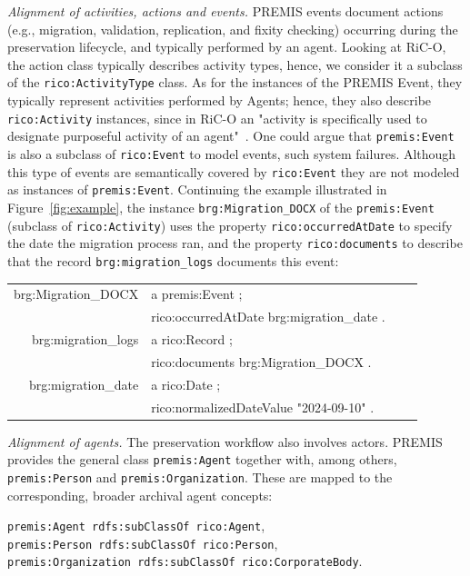 \documentclass[runningheads]{llncs}
\makeatletter
\newenvironment{rdfexpressions}
{%
	\par
	\begingroup
	\centering
	\ttfamily
	\begin{tabular}{@{}r@{\ }l@{\ }l@{}l@{}}
	}
	{%
	\end{tabular}
	\par
	\endgroup
}
\makeatother
\begin{document}
	
	\emph{Alignment of activities, actions and events.}
	PREMIS events document actions (e.g., migration, validation, replication, and fixity checking) occurring during the preservation lifecycle, and typically performed by an agent. Looking at RiC-O, the action class typically describes activity types, hence, we consider it a subclass of the \texttt{rico:ActivityType} class. As for the instances of the PREMIS Event, they typically represent activities performed by Agents; hence, they also describe \texttt{rico:Activity} instances, since in RiC-O an "activity is specifically used to designate purposeful activity of an agent"~\cite{RICCM,RiCO}. One could argue that \texttt{premis:Event} is also a subclass of \texttt{rico:Event} to model events, such system failures. Although this type of events are semantically covered by \texttt{rico:Event} they are not modeled as instances of \texttt{premis:Event}. 
	Continuing the example illustrated in Figure~\ref{fig:example}, the instance \texttt{brg:Migration\_DOCX} of the \texttt{premis:Event} (subclass of \texttt{rico:Activity}) uses the property \texttt{rico:occurredAtDate} to specify the date the migration process ran, and the property \texttt{rico:documents} to describe that the record \texttt{brg:migration\_logs} documents this event:
	\begin{rdfexpressions}
		brg:Migration\_DOCX & a premis:Event ; & \\
		& rico:occurredAtDate brg:migration\_date . &\\	
		brg:migration\_logs & a rico:Record ; &\\
		& rico:documents brg:Migration\_DOCX . & \\
		brg:migration\_date & a rico:Date ; &\\
		& rico:normalizedDateValue "2024-09-10" . &
	\end{rdfexpressions}
\emph{Alignment of agents.}
The preservation workflow also involves actors. PREMIS provides the general
class \texttt{premis:Agent} together with, among others,
\texttt{premis:Person} and \texttt{premis:Organization}. These are mapped
to the corresponding, broader archival agent concepts:

\begin{center}
	\texttt{premis:Agent rdfs:subClassOf rico:Agent},\\
	\texttt{premis:Person rdfs:subClassOf rico:Person},\\
	\texttt{premis:Organization rdfs:subClassOf rico:CorporateBody}.
\end{center}
\end{document}

